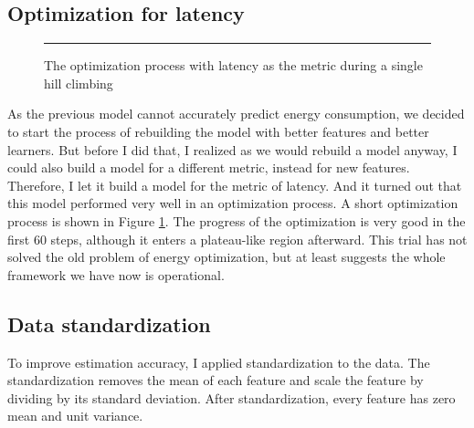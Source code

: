\documentclass[12pt]{article}
\theoremstyle{definition}
\begin{document}
\subsection{Optimization for latency}
\begin{figure}[htb]
    \centering
    \begin{subfigure}
      {\texttt{[image: trace-2015-01-09.png]}}
    \end{subfigure}
    \rule{\linewidth}{1pt}
    \caption{The optimization process with latency as the metric during a single hill climbing}
    \label{fig:latency}
\end{figure}
As the previous model cannot accurately predict energy consumption, we decided to start the process of rebuilding the model with better features and better learners. But before I did that, I realized as we would rebuild a model anyway, I could also build a model for a different metric, instead for new features. Therefore, I let it build a model for the metric of latency. And it turned out that this model performed very well in an optimization process. A short optimization process is shown in Figure \ref{fig:latency}. The progress of the optimization is very good in the first 60 steps, although it enters a plateau-like region afterward. This trial has not solved the old problem of energy optimization, but at least suggests the whole framework we have now is operational.
\subsection{Data standardization}
To improve estimation accuracy, I applied standardization to the data. The standardization removes the mean of each feature and scale the feature by dividing by its standard deviation. After standardization, every feature has zero mean and unit variance.
\end{document}
